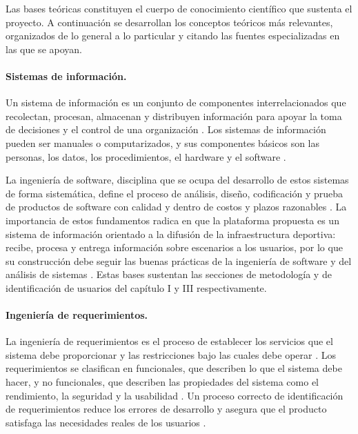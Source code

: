 Las bases te\'oricas constituyen el cuerpo de conocimiento cient\'ifico que
sustenta el proyecto. A continuaci\'on se desarrollan los conceptos te\'oricos
m\'as relevantes, organizados de lo general a lo particular y citando las
fuentes especializadas en las que se apoyan.

\paragraph{Sistemas de informaci\'on.} Un sistema de informaci\'on es un
conjunto de componentes interrelacionados que recolectan, procesan, almacenan
y distribuyen informaci\'on para apoyar la toma de decisiones y el control de
una organizaci\'on \citep{kendall2011}. Los sistemas de informaci\'on pueden
ser manuales o computarizados, y sus componentes b\'asicos son las personas,
los datos, los procedimientos, el hardware y el software \citep{kendall2011}.

La ingenier\'ia de software, disciplina que se ocupa del desarrollo de estos
sistemas de forma sistem\'atica, define el proceso de an\'alisis, dise\~no,
codificaci\'on y prueba de productos de software con calidad y dentro de
costos y plazos razonables \citep{pressman2010, sommerville2011}. La
importancia de estos fundamentos radica en que la plataforma propuesta es un
sistema de informaci\'on orientado a la difusi\'on de la infraestructura
deportiva: recibe, procesa y entrega informaci\'on sobre escenarios a
los usuarios, por lo que su construcci\'on debe seguir las buenas pr\'acticas
de la ingenier\'ia de software y del an\'alisis de sistemas \citep{kendall2011,
pressman2010}. Estas bases sustentan las secciones de metodolog\'ia y de
identificaci\'on de usuarios del cap\'itulo I y III respectivamente.

\paragraph{Ingenier\'ia de requerimientos.} La ingenier\'ia de requerimientos
es el proceso de establecer los servicios que el sistema debe proporcionar y
las restricciones bajo las cuales debe operar \citep{sommerville2011}. Los
requerimientos se clasifican en funcionales, que describen lo que el sistema
debe hacer, y no funcionales, que describen las propiedades del sistema como
el rendimiento, la seguridad y la usabilidad \citep{sommerville2011,
kendall2011}. Un proceso correcto de identificaci\'on de requerimientos reduce
los errores de desarrollo y asegura que el producto satisfaga las necesidades
reales de los usuarios \citep{sommerville2011}.

